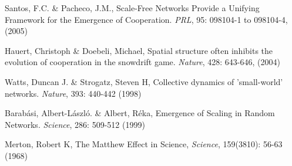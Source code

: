 \begin{thebibliography}{50}
 Santos, F.C. \& Pacheco, J.M., Scale-Free
  Networks Provide a Unifying Framework for the Emergence of
  Cooperation. \textit{PRL}, 95: 098104-1 to 098104-4, (2005) 

 Hauert, Christoph \& Doebeli, Michael, Spatial
  structure often inhibits the evolution of cooperation in the
  snowdrift game. \textit{Nature}, 428: 643-646,  (2004)
  
 Watts, Duncan J. \& Strogatz, Steven H, Collective dynamics
  of 'small-world' networks. \textit{Nature}, 393: 440-442 (1998)

 Barab\'asi, Albert-L\'aszl\'o. \& Albert, R\'eka, Emergence of
  Scaling in Random Networks. \textit{Science}, 286: 509-512 (1999)



 Merton, Robert K, The Matthew Effect in Science, \textit{Science}, 159(3810): 56-63 (1968)


%
\end{thebibliography}



